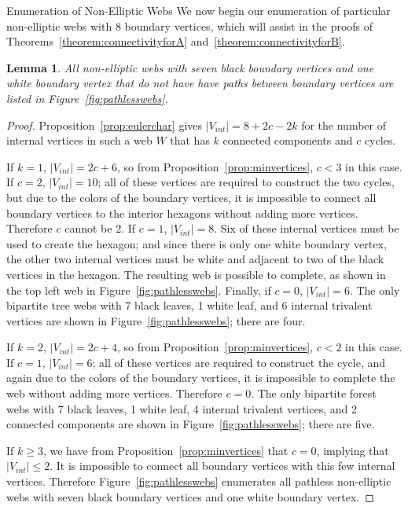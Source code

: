 \documentclass[11pt]{article}
\newtheorem{lemma}[theo]{Lemma}
\theoremstyle{definition}
\numberwithin{equation}{section}
\numberwithin{equation}{section}
\begin{document}
\begin{subsection}{Enumeration of Non-Elliptic Webs}
We now begin our enumeration of particular non-elliptic webs with 8 boundary vertices, which will assist in the proofs of Theorems~\ref{theorem:connectivityforA} and~\ref{theorem:connectivityforB}.

\begin{lemma}\label{lemma:pathlesswebs}
All non-elliptic webs with seven black boundary vertices and one white boundary vertex that do not have have paths between boundary vertices are listed in Figure~\ref{fig:pathlesswebs}.
\end{lemma}

\begin{proof}
Proposition~\ref{prop:eulerchar} gives $|V_{int}|=8+2c-2k$ for the number of internal vertices in such a web $W$ that has $k$ connected components and $c$ cycles.

If $k=1$, $|V_{int}|=2c+6$, so from Proposition~\ref{prop:minvertices}, $c<3$ in this case. If $c=2$, $|V_{int}|=10$; all of these vertices are required to construct the two cycles, but due to the colors of the boundary vertices, it is impossible to connect all boundary vertices to the interior hexagons without adding more vertices. Therefore $c$ cannot be 2. If $c=1$, $|V_{int}|=8$. Six of these internal vertices must be used to create the hexagon; and since there is only one white boundary vertex, the other two internal vertices must be white and adjacent to two of the black vertices in the hexagon. The resulting web is possible to complete, as shown in the top left web in Figure~\ref{fig:pathlesswebs}. Finally, if $c=0$, $|V_{int}|=6$. The only bipartite tree webs with 7 black leaves, 1 white leaf, and 6 internal trivalent vertices are shown in Figure~\ref{fig:pathlesswebs}; there are four.

If $k=2$, $|V_{int}|=2c+4$, so from Proposition~\ref{prop:minvertices}, $c<2$ in this case. If $c=1$, $|V_{int}|=6$; all of these vertices are required to construct the cycle, and again due to the colors of the boundary vertices, it is impossible to complete the web without adding more vertices. Therefore $c=0$. The only bipartite forest webs with 7 black leaves, 1 white leaf, 4 internal trivalent vertices, and 2 connected components are shown in Figure~\ref{fig:pathlesswebs}; there are five.

If $k\geq 3$, we have from Proposition~\ref{prop:minvertices} that $c=0$, implying that $|V_{int}|\leq 2$. It is impossible to connect all boundary vertices with this few internal vertices. Therefore Figure~\ref{fig:pathlesswebs} enumerates all pathless non-elliptic webs with seven black boundary vertices and one white boundary vertex.
\end{proof}


\end{subsection}
\end{document}
